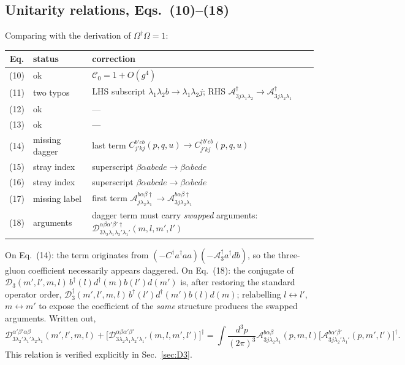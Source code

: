 \documentclass[11pt]{article}
\newcommand{\dg}{\dagger}
\newcommand{\ip}[1]{\int\!\frac{d^{3}#1}{(2\pi)^{3}}}
\newcommand{\OM}{\Omega}
\begin{document}
\subsection{Unitarity relations, Eqs.~(10)--(18)}

Comparing with the derivation of $\OM^{\dg}\OM=1$:

\begin{center}
\renewcommand{\arraystretch}{1.3}
\begin{tabular}{cll}
\hline
Eq. & status & correction\\
\hline
(10) & ok & $\mathcal C_0=1+O(g^{4})$\\
(11) & {\color{red}two typos} & LHS subscript $\lambda_1\lambda_2 b\to\lambda_1\lambda_2 j$;
RHS $\mathcal A^{\dg}_{3j\lambda_1\lambda_2}\to\mathcal A^{\dg}_{3j\lambda_2\lambda_1}$\\
(12) & ok & ---\\
(13) & ok & ---\\
(14) & {\color{red}missing dagger} & last term $C^{b'cb}_{j'kj}(p,q,u)\to
C^{\dg b'cb}_{j'kj}(p,q,u)$\\
(15) & {\color{red}stray index} & superscript $\beta\alpha abcde\to\beta\alpha bcde$\\
(16) & {\color{red}stray index} & superscript $\beta\alpha abcde\to\beta\alpha bcde$\\
(17) & {\color{red}missing label} & first term $\mathcal A^{b\alpha\beta\dg}_{j\lambda_2\lambda_1}
\to\mathcal A^{b\alpha\beta\dg}_{3j\lambda_2\lambda_1}$\\
(18) & {\color{red}arguments} & dagger term must carry \emph{swapped} arguments:
$\mathcal D^{\alpha\beta\alpha'\beta'\dg}_{3\lambda_2\lambda_1\lambda_2'\lambda_1'}(m,l,m',l')$\\
\hline
\end{tabular}
\end{center}

\noindent
On Eq.~(14): the term originates from $(-C^{\dg}a^{\dg}aa)(-\mathcal A^{\dg}_{3}a^{\dg}db)$, so
the three-gluon coefficient necessarily appears daggered. On Eq.~(18): the conjugate of
$\mathcal D_3(m',l',m,l)\,b^{\dg}(l)d^{\dg}(m)b(l')d(m')$ is, after restoring the standard
operator order, $\mathcal D^{\dg}_3(m',l',m,l)\,b^{\dg}(l')d^{\dg}(m')b(l)d(m)$; relabelling
$l\!\leftrightarrow\! l'$, $m\!\leftrightarrow\! m'$ to expose the coefficient of the
\emph{same} structure produces the swapped arguments. Written out,
\begin{equation}
\mathcal D^{\alpha'\beta'\alpha\beta}_{3\lambda_2'\lambda_1'\lambda_2\lambda_1}(m',l',m,l)
+\Big[\mathcal D^{\alpha\beta\alpha'\beta'}_{3\lambda_2\lambda_1\lambda_2'\lambda_1'}(m,l,m',l')\Big]^{\dg}
=\ip{p}\mathcal A^{b\alpha\beta}_{3j\lambda_2\lambda_1}(p,m,l)
\Big[\mathcal A^{b\alpha'\beta'}_{3j\lambda_2'\lambda_1'}(p,m',l')\Big]^{\dg}.
\label{eq:U18}
\end{equation}
This relation is verified explicitly in Sec.~\ref{sec:D3}.
\end{document}
